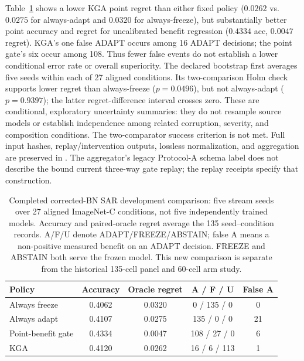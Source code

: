 Table~\ref{tab:sar-corrected-fiveseed} shows a lower KGA point regret than either fixed policy ($0.0262$ vs.\
$0.0275$ for always-adapt and $0.0320$ for always-freeze), but substantially better point accuracy and
regret for uncalibrated benefit regression ($0.4334$ acc, $0.0047$ regret). KGA's one false ADAPT occurs
among 16 ADAPT decisions; the point gate's six occur among 108. Thus fewer false events do not establish a
lower conditional error rate or overall superiority. The declared bootstrap first averages five seeds within
each of 27 aligned conditions. Its two-comparison Holm check supports lower regret than always-freeze
($p = 0.0496$), but not always-adapt ($p = 0.9397$); the latter regret-difference interval crosses zero.
These are conditional, exploratory uncertainty summaries: they do not resample source models or establish
independence among related corruption, severity, and composition conditions. The two-comparator success
criterion is not met. Full input hashes, replay/intervention outputs, lossless normalization, and aggregation
are preserved in .
The aggregator's legacy Protocol-A schema label does not describe the bound current three-way gate replay;
the replay receipts specify that construction.

\begin{table}[t]
\centering
\small
\caption{Completed corrected-BN SAR development comparison: five stream seeds over 27 aligned ImageNet-C conditions, not five independently trained models. Accuracy and paired-oracle regret average the 135 seed--condition records. A/F/U denote ADAPT/FREEZE/ABSTAIN; false A means a non-positive measured benefit on an ADAPT decision. FREEZE and ABSTAIN both serve the frozen model. This new comparison is separate from the historical 135-cell panel and 60-cell arm study.}
\label{tab:sar-corrected-fiveseed}
\begin{tabular}{@{}lcccc@{}}
\toprule
Policy & Accuracy & Oracle regret & A / F / U & False A \\
\midrule
Always freeze      & 0.4062 & 0.0320 & 0 / 135 / 0  & 0 \\
Always adapt       & 0.4107 & 0.0275 & 135 / 0 / 0  & 21 \\
Point-benefit gate & 0.4334 & 0.0047 & 108 / 27 / 0 & 6 \\
KGA                & 0.4120 & 0.0262 & 16 / 6 / 113 & 1 \\
\bottomrule
\end{tabular}
\end{table}

